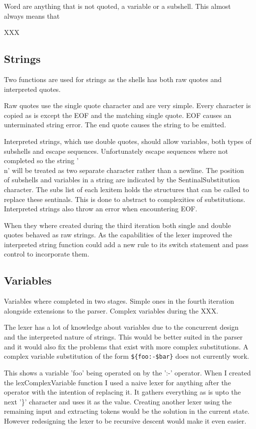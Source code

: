 Word are anything that is not quoted, a variable or a subshell.
This almost always means that

XXX

\subsection{Strings}
Two functions are used for strings as the shells has both raw quotes and interpreted quotes.

Raw quotes use the single quote character and are very simple.
Every character is copied as is except the EOF and the matching single quote.
EOF causes an unterminated string error.
The end quote causes the string to be emitted.

Interpreted strings, which use double quotes, should allow variables, both types of subshells and escape sequences.
Unfortunately escape sequences where not completed so the string '\\n' will be treated as two separate character rather than a newline.
The position of subshells and variables in a string are indicated by the SentinalSubstitution character.
The subs list of each lexitem holds the structures that can be called to replace these sentinals.
This is done to abstract to complexities of substitutions.
Interpreted strings also throw an error when encountering EOF.

When they where created during the third iteration both single and double quotes behaved as raw strings.
As the capabilities of the lexer improved the interpreted string function could add a new rule to its switch statement and
pass control to incorporate them.

\subsection{Variables}
Variables where completed in two stages.
Simple ones in the fourth iteration alongside extensions to the parser.
Complex variables during the XXX.

The lexer has a lot of knowledge about variables due to the concurrent design and the interpreted nature of strings.
This would be better suited in the parser and it would also fix the problems that exist with more complex substitutions.
A complex variable substitution of the form \verb!${foo:-$bar}! does not currently work.

This shows a variable 'foo' being operated on by the ':-' operator.
When I created the lexComplexVariable function I used a naive lexer for anything after the operator with the intention of replacing it.
It gathers everything as is upto the next '\}' character and uses it as the value.
Creating another lexer using the remaining input and extracting tokens would be the solution in the current state.
However redesigning the lexer to be recursive descent would make it even easier.

